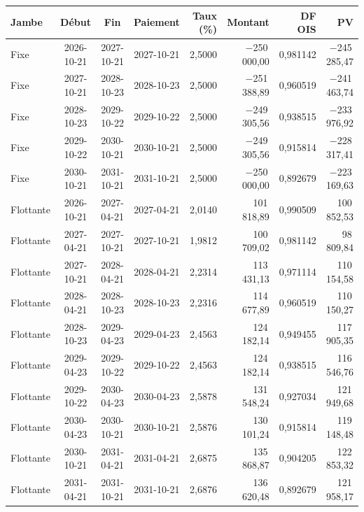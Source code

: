 \begin{tabular}{@{}lcccrrrr@{}}
\toprule
Jambe & Début & Fin & Paiement & Taux (\%) & Montant & DF OIS & PV \\
\midrule
Fixe & 2026-10-21 & 2027-10-21 & 2027-10-21 & 2{,}5000 & $-$250\,000{,}00 & 0{,}981142 & $-$245\,285{,}47 \\
Fixe & 2027-10-21 & 2028-10-23 & 2028-10-23 & 2{,}5000 & $-$251\,388{,}89 & 0{,}960519 & $-$241\,463{,}74 \\
Fixe & 2028-10-23 & 2029-10-22 & 2029-10-22 & 2{,}5000 & $-$249\,305{,}56 & 0{,}938515 & $-$233\,976{,}92 \\
Fixe & 2029-10-22 & 2030-10-21 & 2030-10-21 & 2{,}5000 & $-$249\,305{,}56 & 0{,}915814 & $-$228\,317{,}41 \\
Fixe & 2030-10-21 & 2031-10-21 & 2031-10-21 & 2{,}5000 & $-$250\,000{,}00 & 0{,}892679 & $-$223\,169{,}63 \\
Flottante & 2026-10-21 & 2027-04-21 & 2027-04-21 & 2{,}0140 & 101\,818{,}89 & 0{,}990509 & 100\,852{,}53 \\
Flottante & 2027-04-21 & 2027-10-21 & 2027-10-21 & 1{,}9812 & 100\,709{,}02 & 0{,}981142 & 98\,809{,}84 \\
Flottante & 2027-10-21 & 2028-04-21 & 2028-04-21 & 2{,}2314 & 113\,431{,}13 & 0{,}971114 & 110\,154{,}58 \\
Flottante & 2028-04-21 & 2028-10-23 & 2028-10-23 & 2{,}2316 & 114\,677{,}89 & 0{,}960519 & 110\,150{,}27 \\
Flottante & 2028-10-23 & 2029-04-23 & 2029-04-23 & 2{,}4563 & 124\,182{,}14 & 0{,}949455 & 117\,905{,}35 \\
Flottante & 2029-04-23 & 2029-10-22 & 2029-10-22 & 2{,}4563 & 124\,182{,}14 & 0{,}938515 & 116\,546{,}76 \\
Flottante & 2029-10-22 & 2030-04-23 & 2030-04-23 & 2{,}5878 & 131\,548{,}24 & 0{,}927034 & 121\,949{,}68 \\
Flottante & 2030-04-23 & 2030-10-21 & 2030-10-21 & 2{,}5876 & 130\,101{,}24 & 0{,}915814 & 119\,148{,}48 \\
Flottante & 2030-10-21 & 2031-04-21 & 2031-04-21 & 2{,}6875 & 135\,868{,}87 & 0{,}904205 & 122\,853{,}32 \\
Flottante & 2031-04-21 & 2031-10-21 & 2031-10-21 & 2{,}6876 & 136\,620{,}48 & 0{,}892679 & 121\,958{,}17 \\
\bottomrule
\end{tabular}
